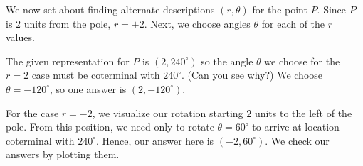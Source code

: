 \documentclass{ximera}
\begin{document}
\begin{example}
\begin{explanation}
\begin{enumerate}
\begin{image}
\end{image}

We now set about finding alternate descriptions $(r,\theta)$ for the point $P$. Since $P$ is $2$ units from the pole, $r = \pm 2$.  Next, we choose angles $\theta$ for each of the $r$ values.  

 

The given representation for $P$ is $\left(2, 240^{\circ}\right)$ so the angle $\theta$ we choose for the  $r = 2$ case must be coterminal with $240^{\circ}$. (Can you see why?)  We choose $\theta = -120^{\circ}$, so one answer  is  $\left(2,-120^{\circ}\right)$. 

 

For the case  $r = -2$, we visualize our rotation starting $2$ units to the left of the pole.  From this position, we need only to rotate $\theta = 60^{\circ}$ to arrive at location coterminal with $240^{\circ}$.  Hence, our answer here is  $\left(-2,60^{\circ}\right)$.  We check our answers by plotting them.


\end{enumerate}
\end{explanation}
\end{example}
\end{document}
